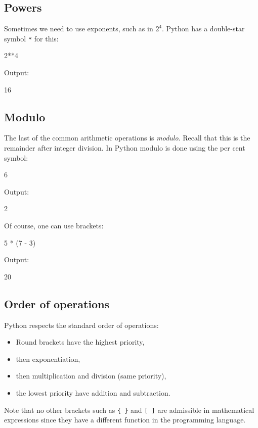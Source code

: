 \subsection{Powers}
Sometimes we need to use exponents, such as in $2^4$. Python has a double-star
symbol {\tt **} for this:

\begin{bluecode}
2**4
\end{bluecode}
Output:

\begin{bluecode}
16
\end{bluecode}
\subsection{Modulo}
The last of the common arithmetic operations is {\em modulo}. Recall that this is the remainder 
after integer division. In Python modulo is done using the per cent symbol:

\begin{bluecode}
6 %
\end{bluecode}
Output:

\begin{bluecode}
2
\end{bluecode}
Of course, one can use brackets:

\begin{bluecode}
5 * (7 - 3)
\end{bluecode}
Output:

\begin{bluecode}
20
\end{bluecode}
\subsection{Order of operations}
Python respects the standard order of operations:

\begin{itemize} 
\item Round brackets have the highest priority,
\item then exponentiation, 
\item then multiplication and division (same priority),
\item the lowest priority have addition and subtraction.
\end{itemize}
Note that no other brackets such as {\tt \{ \}} and {\tt [ ]} are 
admissible in mathematical expressions since they have a different 
function in the programming language.

